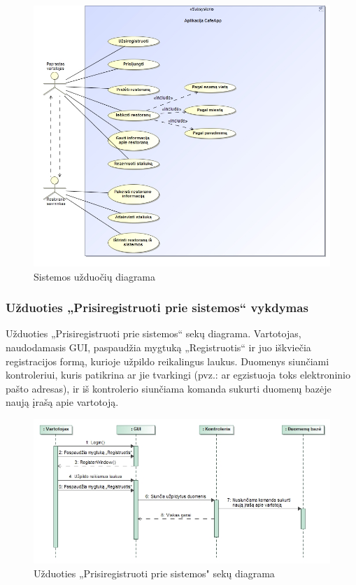 \documentclass{VUMIFPSkursinis}
\begin{document}
\begin{figure}[H]
	\centering
	\includegraphics[width=\textwidth,height=\textheight,keepaspectratio]{img/SystemTasks}
	\caption{Sistemos užduočių diagrama}
	\label{img:SystemTasks}
\end{figure}

\subsubsection{Užduoties „Prisiregistruoti prie sistemos“ vykdymas}
Užduoties „Prisiregistruoti prie sistemos“ sekų diagrama. Vartotojas, naudodamasis GUI, paspaudžia mygtuką „Registruotis“ ir juo iškviečia registracijos formą, kurioje užpildo reikalingus laukus. Duomenys siunčiami kontroleriui, kuris patikrina ar jie tvarkingi (pvz.: ar egzistuoja toks elektroninio pašto adresas), ir iš kontrolerio siunčiama komanda sukurti duomenų bazėje naują įrašą apie vartotoją.

\begin{figure}[H]
	\centering
	\includegraphics[width=\textwidth,height=\textheight,keepaspectratio]{img/Register}
	\caption{Užduoties „Prisiregistruoti prie sistemos" sekų diagrama}
	\label{img:RegisterTask}
\end{figure}
\end{document}
